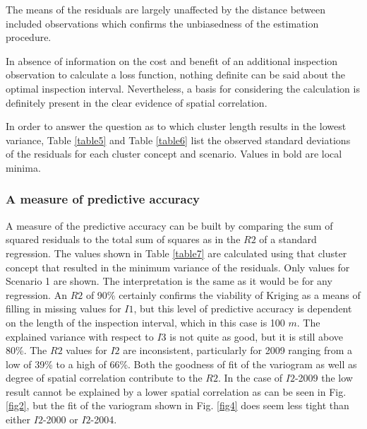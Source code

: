 \documentclass[Journal]{ascelike}
\begin{document}
The means of the residuals are largely unaffected by the distance between included observations which confirms the 
unbiasedness of the estimation procedure.

In absence of information on the cost and benefit of an additional inspection observation to calculate a loss function, nothing definite can be said about the optimal inspection interval. Nevertheless, a basis for considering the calculation is definitely present in the clear evidence of spatial correlation.

In order to answer the question as to which cluster length results in the lowest variance, Table \ref{table5} and Table \ref{table6} list the observed standard deviations of the residuals for each cluster concept and scenario. Values in bold are local minima.
\subsubsection{A measure of predictive accuracy} \label{casestudy43}
A measure of the predictive accuracy can be built by comparing the sum of squared residuals
to the total sum of squares as in the $R2$ of a standard regression. The values shown in Table \ref{table7}
are calculated using that cluster concept that resulted in the minimum variance of the
residuals. Only values for Scenario 1 are shown. The interpretation is the same as it would be
for any regression. An $R2$ of 90\% certainly confirms the viability of Kriging as a means of
filling in missing values for $I1$, but this level of predictive accuracy is dependent on the length
of the inspection interval, which in this case is 100 $m$. The explained variance with respect to
$I3$ is not quite as good, but it is still above 80\%. The $R2$ values for $I2$ are inconsistent,
particularly for 2009 ranging from a low of 39\% to a high of 66\%. Both the goodness of fit of
the variogram as well as degree of spatial correlation contribute to the $R2$. In the case of
$I2$-2009 the low result cannot be explained by a lower spatial correlation as can be seen in Fig. \ref{fig2}, but the fit of the variogram shown in Fig. \ref{fig4} does seem less tight than either $I2$-2000 or
$I2$-2004.
\end{document}
